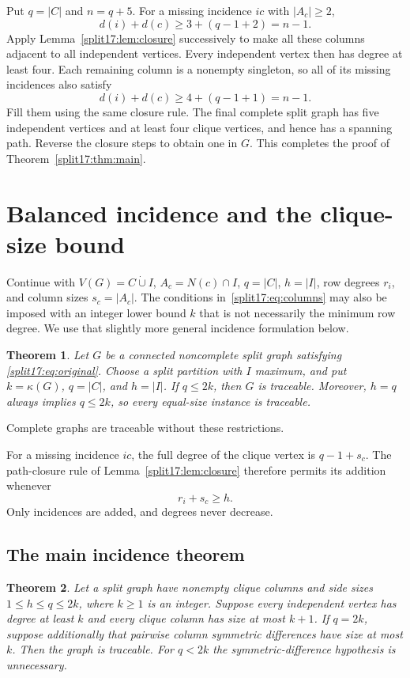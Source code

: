\documentclass[11pt,a4paper]{article}
\newtheorem{theorem}{Theorem}[section]
\theoremstyle{definition}\newtheorem{definition}[theorem]{Definition}
\theoremstyle{remark}\newtheorem{remark}[theorem]{Remark}
\begin{document}
Put $q=|C|$ and $n=q+5$. For a missing incidence $ic$ with $|A_c|\ge2$,
\[
 d(i)+d(c)\ge3+(q-1+2)=n-1.
\]
Apply Lemma~\ref{split17:lem:closure} successively to make all these columns
adjacent to all independent vertices. Every independent vertex then has
degree at least four. Each remaining column is a nonempty singleton,
so all of its missing incidences also satisfy
\[
 d(i)+d(c)\ge4+(q-1+1)=n-1.
\]
Fill them using the same closure rule. The final complete split graph has
five independent vertices and at least four clique vertices, and hence
has a spanning path. Reverse the closure steps to obtain one in $G$.
This completes the proof of Theorem~\ref{split17:thm:main}.



\section{Balanced incidence and the clique-size bound}
\label{sec:split-bounds}
Continue with $V(G)=C\mathbin{\dot\cup}I$, $A_c=N(c)\cap I$,
$q=|C|$, $h=|I|$, row degrees $r_i$, and column sizes $s_c=|A_c|$.
The conditions in~\eqref{split17:eq:columns} may also be imposed with
an integer lower bound $k$ that is not necessarily the minimum row
degree. We use that slightly more general incidence formulation below.


\begin{theorem}\label{split19:thm:graph}
Let $G$ be a connected noncomplete split graph satisfying
\eqref{split17:eq:original}. Choose a split partition with $I$ maximum, and put
$k=\kappa(G)$, $q=|C|$, and $h=|I|$. If $q\le2k$, then $G$ is traceable.
Moreover, $h=q$ always implies $q\le2k$, so every equal-size instance
is traceable.
\end{theorem}
Complete graphs are traceable without these restrictions.



For a missing incidence $ic$, the full degree of the
clique vertex is $q-1+s_c$. The path-closure rule of
Lemma~\ref{split17:lem:closure} therefore permits its addition whenever
\begin{equation}\label{split19:eq:threshold}
 r_i+s_c\ge h.
\end{equation}
Only incidences are added, and degrees never decrease.


\subsection{The main incidence theorem}
\begin{theorem}\label{split19:thm:matrix}
Let a split graph have nonempty clique columns and side sizes
$1\le h\le q\le2k$, where $k\ge1$ is an integer. Suppose every independent
vertex has degree at least $k$ and every clique column has size at most
$k+1$. If $q=2k$, suppose additionally that pairwise column symmetric
differences have size at most $k$. Then the graph is traceable.
For $q<2k$ the symmetric-difference hypothesis is unnecessary.
\end{theorem}
\end{document}
